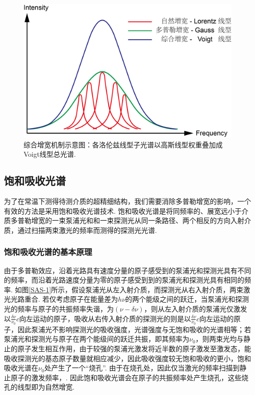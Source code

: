 \documentclass[UTF8,a4paper,10pt]{article}
\begin{document}
\begin{figure}[h]
    \centering
    \includegraphics[width=.6\textwidth]{Broadening.png}
    \caption{综合增宽机制示意图：各洛伦兹线型子光谱以高斯线型权重叠加成Voigt线型总光谱.}
    \label{Broadening}
\end{figure}

\subsection{饱和吸收光谱}

为了在常温下测得待测介质的超精细结构，我们需要消除多普勒增宽的影响，一个有效的方法是采用饱和吸收光谱技术. 饱和吸收光谱是将同频率的、展宽远小于介质多普勒增宽的一束泵浦光和和一束探测光从同一条路径、两个相反的方向入射介质，通过扫描两束激光的频率而测得的探测光光谱.

\subsubsection{饱和吸收光谱的基本原理}

由于多普勒效应，沿着光路具有速度分量的原子感受到的泵浦光和探测光具有不同的频率，而沿着光路速度分量为零的原子感受到到的泵浦光和探测光具有相同的频率. 如图\ref{SAS-1}所示，假设泵浦光从左入射介质，而探测光从右入射介质，两束激光光路重合. 若仅考虑原子在能量差为$h\nu$的两个能级之间的跃迁，当泵浦光和探测光的频率与原子的共振频率失谐，为$(\nu-\delta\nu)$，则从左入射介质的泵浦光仅激发以$\frac{\delta\nu}{\nu_0}c$向左运动的原子，吸收从右传入射介质的探测光的则是以$\frac{\delta\nu}{\nu_0}c$向左运动的原子，因此泵浦光不影响探测光的吸收强度，光谱强度与无饱和吸收的光谱相等；若泵浦光和探测光与原子在两个能级间的跃迁共振，即其频率为$\nu_0$，则两束光均与静止的原子发生相互作用，由于较强的泵浦光激发将近半数的原子激发至激发态，能吸收探测光的基态原子数量就相应减少，因此吸收强度较无饱和吸收的更小，饱和吸收光谱在$\nu_0$处产生了一个“烧孔”. 由于在烧孔处，因此仅当激光的频率扫描到静止原子的激发频率，. 因此饱和吸收光谱会在原子的共振频率处产生烧孔，这些烧孔的线型即为自然增宽.
\end{document}
